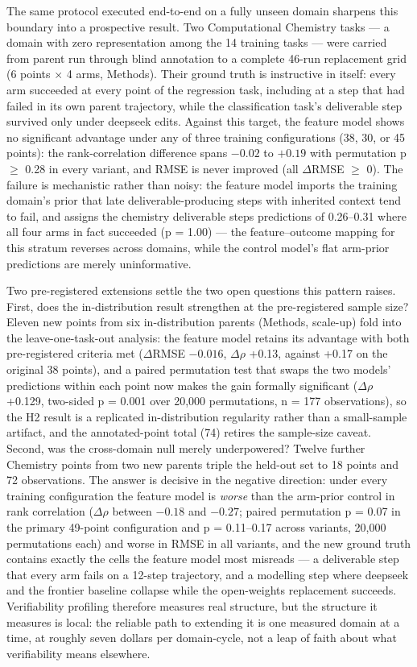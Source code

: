 The same protocol executed end-to-end on a fully unseen domain sharpens this boundary into a prospective result. Two Computational Chemistry tasks --- a domain with zero representation among the 14 training tasks --- were carried from parent run through blind annotation to a complete 46-run replacement grid (6 points $\times$ 4 arms, Methods). Their ground truth is instructive in itself: every arm succeeded at every point of the regression task, including at a step that had failed in its own parent trajectory, while the classification task's deliverable step survived only under deepseek edits. Against this target, the feature model shows no significant advantage under any of three training configurations (38, 30, or 45 points): the rank-correlation difference spans $-0.02$ to $+0.19$ with permutation p $\geq$ 0.28 in every variant, and RMSE is never improved (all $\Delta$RMSE $\geq$ 0). The failure is mechanistic rather than noisy: the feature model imports the training domain's prior that late deliverable-producing steps with inherited context tend to fail, and assigns the chemistry deliverable steps predictions of 0.26--0.31 where all four arms in fact succeeded (p = 1.00) --- the feature--outcome mapping for this stratum reverses across domains, while the control model's flat arm-prior predictions are merely uninformative.

Two pre-registered extensions settle the two open questions this pattern raises. First, does the in-distribution result strengthen at the pre-registered sample size? Eleven new points from six in-distribution parents (Methods, scale-up) fold into the leave-one-task-out analysis: the feature model retains its advantage with both pre-registered criteria met ($\Delta$RMSE $-0.016$, $\Delta$$\rho$ +0.13, against +0.17 on the original 38 points), and a paired permutation test that swaps the two models' predictions within each point now makes the gain formally significant ($\Delta$$\rho$ +0.129, two-sided p = 0.001 over 20,000 permutations, n = 177 observations), so the H2 result is a replicated in-distribution regularity rather than a small-sample artifact, and the annotated-point total (74) retires the sample-size caveat. Second, was the cross-domain null merely underpowered? Twelve further Chemistry points from two new parents triple the held-out set to 18 points and 72 observations. The answer is decisive in the negative direction: under every training configuration the feature model is \emph{worse} than the arm-prior control in rank correlation ($\Delta$$\rho$ between $-0.18$ and $-0.27$; paired permutation p = 0.07 in the primary 49-point configuration and p = 0.11--0.17 across variants, 20,000 permutations each) and worse in RMSE in all variants, and the new ground truth contains exactly the cells the feature model most misreads --- a deliverable step that every arm fails on a 12-step trajectory, and a modelling step where deepseek and the frontier baseline collapse while the open-weights replacement succeeds. Verifiability profiling therefore measures real structure, but the structure it measures is local: the reliable path to extending it is one measured domain at a time, at roughly seven dollars per domain-cycle, not a leap of faith about what verifiability means elsewhere.
